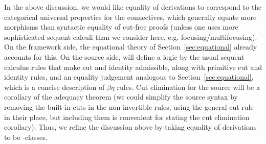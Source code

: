 In the above discussion, we would like equality of derivations to
correspond to the categorical universal properties for the connectives,
which generally equate more morphisms than syntactic equality of
cut-free proofs (unless one uses more sophisticated sequent calculi than
we consider here, e.g. focusing/multifocusing).  On the framework side,
the equational theory of Section~\ref{sec:equational} already accounts
for this.  On the source side, will define a logic by the usual sequent
calculus rules that make cut and identity admissible, along with
primitive cut and identity rules, and an equality judgement analogous to
Section~\ref{sec:equational}, which is a concise description of
$\beta\eta$ rules.  Cut elimination for the source will be a corollary
of the adequacy theorem (we could simplify the source syntax by removing
the built-in cuts in the non-invertible rules, using the general cut
rule in their place, but including them is convenient for stating the
cut elimination corollary).  Thus, we refine the discussion above by
taking equality of derivations to be \deq-classes.

\newcommand\backtrf[1]{\ensuremath{#1^{\leftarrow}}}
\newcommand\backtr[1]{\ensuremath{#1^{\Leftarrow}}}

